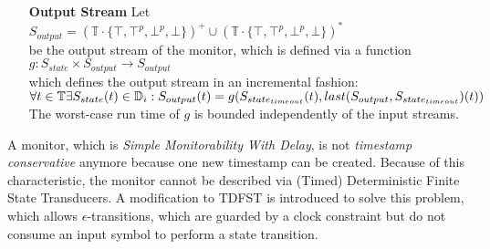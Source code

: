 \begin{definition}
\begin{itemize}
			\item[\textbf{Output Stream}]
				Let $S_{output}= (\mathbb{T}\cdot \{\top, \top^p, \bot^p, \bot\})^+\cup(\mathbb{T}\cdot \{\top, \top^p, \bot^p, \bot\})^*$\\
				be the output stream of the monitor, which is defined via a function\\
				$g:S_{state}\times S_{output}\rightarrow S_{output}$\\
				which defines the output stream in an incremental fashion:\\
				\begin{math}
					\forall t\in \mathbb T \exists S_{state}(t)\in\mathbb D_i:\\
					S_{output}(t)= g(S_{state_{timeout}}(t), last(S_{output}, S_{state_{timeout}})(t))
				\end{math} \\
				The worst-case run time of $g$ is bounded independently of the input streams.
		\end{itemize}
	\end{definition}
		A monitor, which is \textit{Simple Monitorability With Delay}, is not \textit{timestamp conservative} anymore because one new timestamp can be created. Because of this characteristic, the monitor cannot be described via (Timed) Deterministic Finite State Transducers. A modification to TDFST is introduced to solve this problem, which allows $\epsilon$-transitions, which are guarded by a clock constraint but do not consume an input symbol to perform a state transition.
